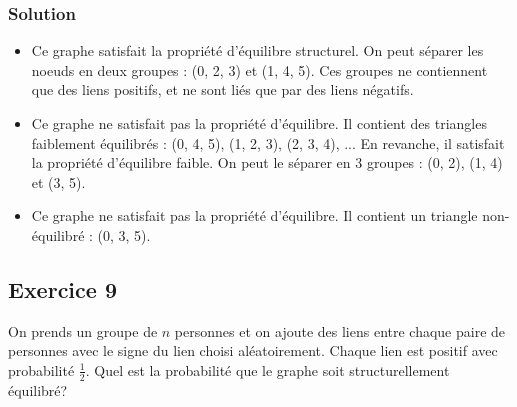 \begin{center}
\end{center}

    \subsubsection*{Solution}
    \begin{itemize}
        \item Ce graphe satisfait la propriété d'équilibre structurel.
        On peut séparer les noeuds en deux groupes : (0, 2, 3) et (1, 4, 5).
        Ces groupes ne contiennent que des liens positifs, et ne sont liés que par des liens négatifs.
        \item Ce graphe ne satisfait pas la propriété d'équilibre.
        Il contient des triangles faiblement équilibrés : (0, 4, 5), (1, 2, 3), (2, 3, 4), ...
        En revanche, il satisfait la propriété d'équilibre faible.
        On peut le séparer en 3 groupes : (0, 2), (1, 4) et (3, 5).
        \item Ce graphe ne satisfait pas la propriété d'équilibre.
        Il contient un triangle non-équilibré : (0, 3, 5).
    \end{itemize}
    

\subsection*{Exercice 9}
On prends un groupe de $n$ personnes et on ajoute des liens entre chaque paire de personnes avec le signe du lien choisi aléatoirement. Chaque lien est positif avec probabilit\'{e} $\frac{1}{2}$.
Quel est la probabilit\'{e} que le graphe soit structurellement \'{e}quilibr\'{e}? 

